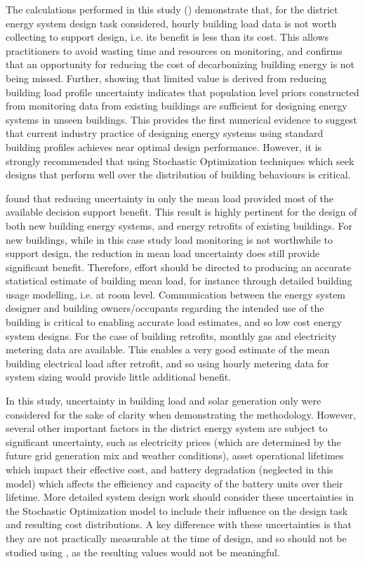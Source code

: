 The  calculations performed in this study () demonstrate that, for the district energy system design task considered, hourly building load data is not worth collecting to support design, i.e. its benefit is less than its cost. This allows practitioners to avoid wasting time and resources on monitoring, and confirms that an opportunity for reducing the cost of decarbonizing building energy is not being missed. Further, showing that limited value is derived from reducing building load profile uncertainty indicates that population level priors constructed from monitoring data from existing buildings are sufficient for designing energy systems in unseen buildings. This provides the first numerical evidence to suggest that current industry practice of designing energy systems using standard building profiles achieves near optimal design performance. However, it is strongly recommended that using Stochastic Optimization techniques which seek designs that perform well over the distribution of building behaviours is critical.

 found that reducing uncertainty in only the mean load provided most of the available decision support benefit. This result is highly pertinent for the design of both new building energy systems, and energy retrofits of existing buildings. For new buildings, while in this case study load monitoring is not worthwhile to support design, the reduction in mean load uncertainty does still provide significant benefit. Therefore, effort should be directed to producing an accurate statistical estimate of building mean load, for instance through detailed building usage modelling, i.e. at room level. Communication between the energy system designer and building owners/occupants regarding the intended use of the building is critical to enabling accurate load estimates, and so low cost energy system designs. For the case of building retrofits, monthly gas and electricity metering data are available. This enables a very good estimate of the mean building electrical load after retrofit, and so using hourly metering data for system sizing would provide little additional benefit.

In this study, uncertainty in building load and solar generation only were considered for the sake of clarity when demonstrating the  methodology. However, several other important factors in the district energy system are subject to significant uncertainty, such as electricity prices (which are determined by the future grid generation mix and weather conditions), asset operational lifetimes which impact their effective cost, and battery degradation (neglected in this model) which affects the efficiency and capacity of the battery units over their lifetime. More detailed system design work should consider these uncertainties in the Stochastic Optimization model to include their influence on the design task and resulting cost distributions. A key difference with these uncertainties is that they are not practically measurable at the time of design, and so should not be studied using , as the resulting values would not be meaningful.

